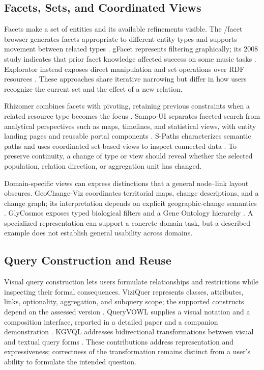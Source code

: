 \documentclass[manuscript,review,screen]{acmart}
\begin{document}
\subsection{Facets, Sets, and Coordinated Views}
Facets make a set of entities and its available refinements visible. The /facet browser generates facets appropriate to different entity types and supports movement between related types \citep{2006_Hildebrand_facet_A}. gFacet represents filtering graphically; its 2008 study indicates that prior facet knowledge affected success on some music tasks \citep{2008_Heim_gFacet_A}. Explorator instead exposes direct manipulation and set operations over RDF resources \citep{2009_Araujo_Experimenting_with}. These approaches share iterative narrowing but differ in how users recognize the current set and the effect of a new relation.

Rhizomer combines facets with pivoting, retaining previous constraints when a related resource type becomes the focus \citep{V3-01105}. Sampo-UI separates faceted search from analytical perspectives such as maps, timelines, and statistical views, with entity landing pages and reusable portal components \citep{2022_Ikkala_Sampo-UI_A}. S-Paths characterizes semantic paths and uses coordinated set-based views to inspect connected data \citep{2021_Destandau_S-Paths_Set-based}. To preserve continuity, a change of type or view should reveal whether the selected population, relation direction, or aggregation unit has changed.

Domain-specific views can express distinctions that a general node--link layout obscures. GeoChange-Viz coordinates territorial maps, change descriptions, and a change graph; its interpretation depends on explicit geographic-change semantics \citep{V3-01218}. GlyCosmos exposes typed biological filters and a Gene Ontology hierarchy \citep{V3-01242}. A specialized representation can support a concrete domain task, but a described example does not establish general usability across domains.

\subsection{Query Construction and Reuse}
Visual query construction lets users formulate relationships and restrictions while inspecting their formal consequences. ViziQuer represents classes, attributes, links, optionality, aggregation, and subquery scope; the supported constructs depend on the assessed version \citep{2018_Cerans_ViziQuer_A,V3-01077}. QueryVOWL supplies a visual notation and a composition interface, reported in a detailed paper and a companion demonstration \citep{V3-02190,V3-02191}. KGVQL addresses bidirectional transformations between visual and textual query forms \citep{V3-01623}. These contributions address representation and expressiveness; correctness of the transformation remains distinct from a user's ability to formulate the intended question.
\end{document}
